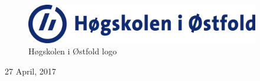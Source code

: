 \begin{figure}[H]
\centering
\includegraphics[width=4in]{Bilder/hiof.jpg}
\caption{Høgskolen i Østfold logo}
\end{figure}
\vfill
{\large 27 April, 2017}\\

 
\vfill %
